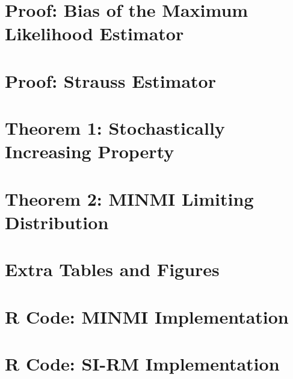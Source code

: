 \documentclass[honours,12pt]{UNSWthesis}
\begin{document}
\appendix

\chapter{Proof: Bias of the Maximum Likelihood Estimator}\label{apx:mle-bias-proof}


\chapter{Proof: Strauss Estimator}\label{apx:strauss-estimator-proof}


\chapter{Theorem 1: Stochastically Increasing Property}\label{apx:minmi-stoch-incr-proof}


\chapter{Theorem 2: MINMI Limiting Distribution}\label{apx:minmi-asymptotics-proof}


\chapter{Extra Tables and Figures}\label{apx:extra-tables-figures}


\chapter{R Code: MINMI Implementation}\label{apx:code-minmi}


\chapter{R Code: SI-RM Implementation}\label{apx:code-si-rm}



\end{document}
